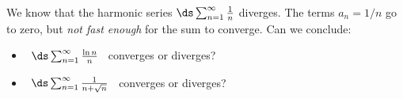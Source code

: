 We know that the harmonic series $\ds \sum_{n=1}^\infty \frac{1}{n}$ diverges.  The terms $a_n=1/n$ go to zero, but \emph{not fast enough} for the sum to converge.  Can we conclude:
\begin{itemize}
\item \, $\ds \sum_{n=1}^\infty \frac{\ln n}{n}$ \, converges or diverges?

\vspace{1.2in}
\item \, $\ds \sum_{n=1}^\infty \frac{1}{n+\sqrt{n}}$ \, converges or diverges?
\end{itemize}